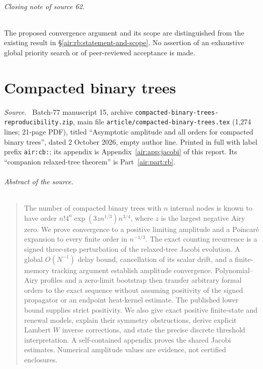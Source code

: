 \documentclass[11pt,letterpaper]{article}
\numberwithin{equation}{section}
\theoremstyle{remark}
\newenvironment{partsource}{\par\medskip\noindent\begin{minipage}{\linewidth}\small\raggedright\textit{Source.}\ }{\end{minipage}\par\medskip}
\newcommand{\repopath}[1]{\nolinkurl{#1}}
\begin{document}
\paragraph{Closing note of source 62.} The proposed convergence argument and its scope are distinguished from the existing result in \S\ref{air:rb:statement-and-scope}. No assertion of an exhaustive global priority search or of peer-reviewed acceptance is made.

\part{Compacted binary trees}\label{air:part:cb}

\begin{partsource}
Batch-77 manuscript 15, archive \repopath{compacted-binary-trees-reproducibility.zip}, main file \repopath{article/compacted-binary-trees.tex} (1,274 lines; 21-page PDF), titled ``Asymptotic amplitude and all orders for compacted binary trees'', dated 2 October 2026, empty author line. Printed in full with label prefix \texttt{air:cb:}; its appendix is Appendix~\ref{air:app:jacobi} of this report. Its ``companion relaxed-tree theorem'' is Part~\ref{air:part:rb}.
\end{partsource}

\paragraph{Abstract of the source.}
\begin{quote}\small
The number of compacted binary trees with $n$ internal nodes is known to have
order $n!4^n\exp(3zn^{1/3})n^{3/4}$, where $z$ is the largest negative Airy zero.
We prove convergence to a positive limiting amplitude and a Poincar\'e expansion
to every finite order in $n^{-1/3}$. The exact counting recurrence is a signed
three-step perturbation of the relaxed-tree Jacobi evolution. A global
$O(N^{-1})$ delay bound, cancellation of its scalar drift, and a finite-memory
tracking argument establish amplitude convergence. Polynomial--Airy profiles
and a zero-limit bootstrap then transfer arbitrary formal orders to the exact
sequence without assuming positivity of the signed propagator or an endpoint
heat-kernel estimate. The published lower bound supplies strict positivity.
We also give exact positive finite-state and renewal models, explain their
symmetry obstructions, derive explicit Lambert $W$ inverse corrections, and
state the precise discrete threshold interpretation. A self-contained appendix
proves the shared Jacobi estimates. Numerical amplitude values are evidence,
not certified enclosures.
\end{quote}
\end{document}
